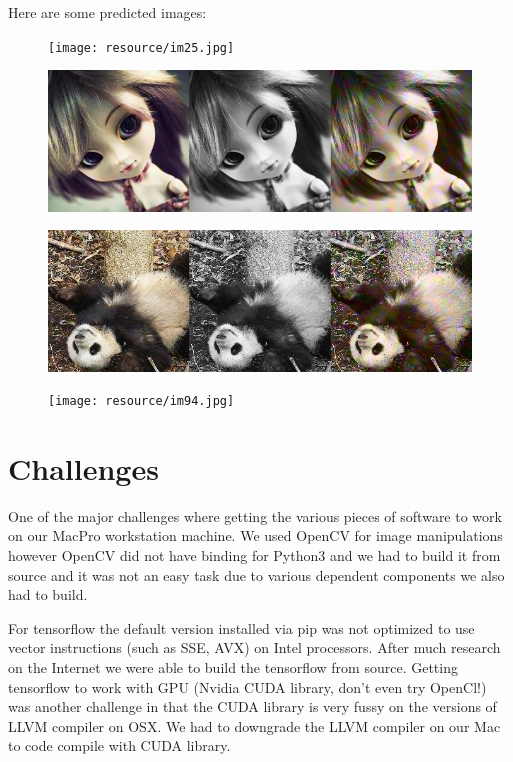 \documentclass[12pt]{article}
\begin{document}
Here are some predicted images:

\begin{figure}[H]
 \centering
 \texttt{[image: resource/im25.jpg]}
\end{figure}


\begin{figure}[H]
 \centering
 \includegraphics[width=5.0in]{resource/im43.jpg}
\end{figure}



\begin{figure}[H]
 \centering
 \includegraphics[width=5.0in]{resource/im89.jpg}
\end{figure}


\begin{figure}[H]
 \centering
 \texttt{[image: resource/im94.jpg]}
\end{figure}


\section{Challenges}
One of the major challenges where getting the various pieces of software to work on our MacPro workstation machine. We used OpenCV for image manipulations however OpenCV did not have binding for Python3 and we had to build it from source and it was not an easy task due to various dependent components we also had to build. 

For tensorflow the default version installed via pip was not optimized to use vector instructions (such as SSE, AVX) on Intel processors. After much research on the Internet we were able to build the tensorflow from source. Getting tensorflow to work with GPU (Nvidia CUDA library, don't even try OpenCl!) was another challenge in that the CUDA library is very fussy on the versions of LLVM compiler on OSX. We had to downgrade the LLVM compiler on our Mac to code compile with CUDA library. 
\end{document}
